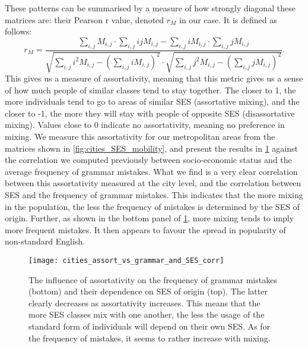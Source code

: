 \documentclass[../thesis.tex]{subfiles}
\begin{document}
These patterns can be summarised by a measure of how strongly diagonal these matrices
are: their Pearson r value, denoted $r_M$ in our case. It is defined as follows:
\begin{equation}
  \label{eq:def_mobility_r}
  r_M = \frac{
      \sum_{i, j} M_{i, j} \cdot \sum_{i, j} i j M_{i, j}
      - \sum_{i, j} i M_{i, j} \cdot \sum_{i, j} j M_{i, j}
    }{
      \sqrt{\sum_{i, j} i^2 M_{i, j} - \left( \sum_{i, j} i M_{i, j} \right)^2}
      \cdot \sqrt{\sum_{i, j} j^2 M_{i, j} - \left( \sum_{i, j} j M_{i, j} \right)^2}
    }.
\end{equation}
This gives us a measure of assortativity, meaning that this metric gives us a sense of
how much people of similar classes tend to stay together. The closer to 1, the more
individuals tend to go to areas of similar \ac{SES} (assortative mixing), and the closer
to -1, the more they will stay with people of opposite \ac{SES} (disassortative mixing).
Values close to 0 indicate no assortativity, meaning no preference in mixing. We measure
this assortativity for our metropolitan areas from the matrices shown in
\cref{fig:cities_SES_mobility}, and present the results in
\cref{fig:cities_assort_vs_grammar_and_SES_corr} against the correlation we computed
previously between socio-economic status and the average frequency of grammar mistakes.
What we find is a very clear correlation between this assortativity measured at the city
level, and the correlation between \ac{SES} and the frequency of grammar mistakes. This
indicates that the more mixing in the population, the less the frequency of mistakes is
determined by the \ac{SES} of origin. Further, as shown in the bottom panel of
\cref{fig:cities_assort_vs_grammar_and_SES_corr}, more mixing tends to imply more
frequent mistakes. It then appears to favour the spread in popularity of non-standard
English.
\begin{figure}
\centering
  \texttt{[image: cities\_assort\_vs\_grammar\_and\_SES\_corr]}
  \caption{The influence of assortativity on the frequency of grammar mistakes (bottom)
  and their dependence on \ac{SES} of origin (top). The latter clearly decreases as
  assortativity increases. This means that the more \ac{SES} classes mix with one
  another, the less the usage of the standard form of individuals will depend on their
  own \ac{SES}. As for the frequency of mistakes, it seems to rather increase with
  mixing.}
  \label{fig:cities_assort_vs_grammar_and_SES_corr}
\end{figure}
\end{document}
